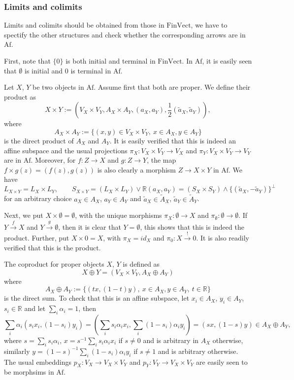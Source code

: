 \documentclass[12pt]{article}
\theoremstyle{definition}
\theoremstyle{remark}
\def \Af{\mathrm{Af}}
\def \FV{\mathrm{FinVect}}
\def\bX{ X}
\def\bY{ Y}
\def\bZ{Z}
\begin{document}
\subsubsection{Limits and colimits}

Limits and colimits should be obtained from those in $\FV$, we have to spectify the other
structures and check  whether the corresponding arrows are in $\Af$. 

\medskip

First, note that $\{0\}$ is both initial and terminal in $\FV$. In $\Af$, it is easily
seen that $\emptyset$ is {initial} and $0$ is {terminal} in $\Af$. 

Let $\bX$, $\bY$ be two objects in $\Af$. Assume first that both are proper. We define
their {product} as
\[
\bX\times \bY:=(V_\bX\times V_\bY, A_\bX\times A_\bY, (a_X,a_Y), \frac12(\tilde a_X,\tilde
a_Y)),
\]
where 
\[
A_\bX\times A_\bY:=\{(x,y)\in V_\bX\times V_\bY,\ x\in A_\bX, y\in A_\bY\}
\]
is the direct product of $A_\bX$ and $A_\bY$. It is easily verified that this is indeed an
affine subspace and the usual projections $\pi_\bX:V_\bX\times V_\bY\to V_\bX$ and $\pi_\bY:V_\bX\times
V_\bY\to V_\bY$ are in $\Af$. Moreover, for $f:\bZ\to \bX$  and $g:\bZ\to \bY$, the map
$f\times g(z)=(f(z),g(z))$ is also clearly a morphism $\bZ\to \bX\times\bY$  in $\Af$. 
We have
\[
L_{X\times Y}=L_X\times L_Y,\qquad S_{X\times Y}= (L_X\times L_Y)\vee \mathbb R(a_X,a_Y)=(S_X\times S_Y)\wedge \{(\tilde
a_X,-\tilde a_Y)\}^\perp
\]
for an arbitrary choice $a_X\in A_X$, $a_Y\in A_Y$ and $\tilde a_X\in \tilde A_X$, $\tilde
a_Y\in \tilde A_Y$.

Next, we put $X\times \emptyset=\emptyset$, with the unique morphisms $\pi_X:\emptyset \to X$
and $\pi_{\emptyset}:\emptyset \to \emptyset$. If $Y\xrightarrow{f}X$ and
$Y\xrightarrow{g} \emptyset$, then it is clear that $Y=\emptyset$, this shows that this is
indeed the product. Further, put  $X\times 0=X$, with $\pi_X=id_X$  and
$\pi_0: X\xrightarrow{!}0$. It is also readily verified that this is the product.

\medskip

The coproduct for proper objects $X$, $Y$ is defined as 
\[
\bX\oplus \bY=(V_\bX\times V_\bY, A_\bX\oplus A_\bY)
\]
where 
\[
A_\bX\oplus A_\bY:=\{(tx,(1-t)y),\ x\in A_{\bX}, y\in A_\bY,\ t\in \mathbb R\}
\]
is the direct sum. To check that this is an affine subspace, let $x_i\in A_\bX$, $y_i\in A_\bY$, $s_i\in
\mathbb R$ and let $\sum_i\alpha_i=1$, then 
\[
\sum_i\alpha_i(s_ix_i,(1-s_i)y_i)=(\sum_is_i\alpha_ix_i,\sum_i(1-s_i)\alpha_iy_i)=(sx,(1-s)y)\in
A_\bX\oplus A_\bY,
\]
where $s=\sum_is_i\alpha_i$, $x=s^{-1}\sum_is_i\alpha_ix_i$ if $s\ne 0$ and is arbitrary
in $A_\bX$ otherwise, similarly $y=(1-s)^{-1}\sum_i(1-s_i)\alpha_iy_i$ if $s\ne 1$ and is
arbitrary otherwise. The usual embeddings  $p_\bX:V_\bX\to V_\bX\times V_\bY$ and $p_\bY:
V_{\bY}\to V_\bX\times V_\bY$ are easily seen to be morphsims in $\Af$.   
\end{document}

